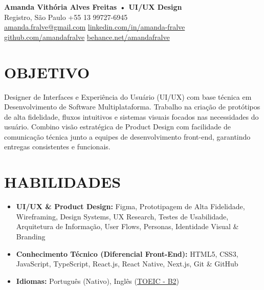 \documentclass[a4paper,10pt]{article}
\begin{document}
\begin{center}
    {\LARGE \textbf{Amanda Vithória Alves Freitas • UI/UX Design}}\\[0.1cm]
    Registro, São Paulo \hspace{1mm} {\textbullet} \hspace{1mm} +55 13 99727-6945
    \\[0.2cm] 
    \href{mailto:amanda.fralve@gmail.com}{amanda.fralve@gmail.com}
    \hspace{1mm}{\textbullet}\hspace{1mm}
    \href{https://www.linkedin.com/in/amanda-fralve}{linkedin.com/in/amanda-fralve}
    \hspace{1mm}{\textbullet}\hspace{1mm}
    \href{https://github.com/amandafralve}{github.com/amandafralve}
    \hspace{1mm}{\textbullet}\hspace{1mm}
    \href{https://www.behance.net/amandafralve}{behance.net/amandafralve}
\end{center}



\section{OBJETIVO} 
    Designer de Interfaces e Experiência do Usuário (UI/UX) com 
    base técnica em Desenvolvimento de Software Multiplataforma.
    Trabalho na criação de protótipos de alta fidelidade, 
    fluxos intuitivos e sistemas visuais focados nas necessidades 
    do usuário. Combino visão estratégica de Product Design com 
    facilidade de comunicação técnica junto a equipes de 
    desenvolvimento front-end, garantindo entregas consistentes e 
    funcionais.



\section{HABILIDADES}
    \begin{itemize}
        \item \textbf{UI/UX \& Product Design:} Figma, Prototipagem de Alta Fidelidade, Wireframing, Design Systems, UX Research, Testes de Usabilidade, Arquitetura de Informação, User Flows, Personas, Identidade Visual \& Branding
        \item \textbf{Conhecimento Técnico (Diferencial Front-End):} HTML5, CSS3, JavaScript, TypeScript, React.js, React Native, Next.js, Git \& GitHub
        \item \textbf{Idiomas:} Português (Nativo), Inglês (\href{https://drive.google.com/file/d/1wQA662aiYXgXoeTkIuQ1UzJLbKcqJmrU/view}{TOEIC - B2})
    \end{itemize}
\end{document}

